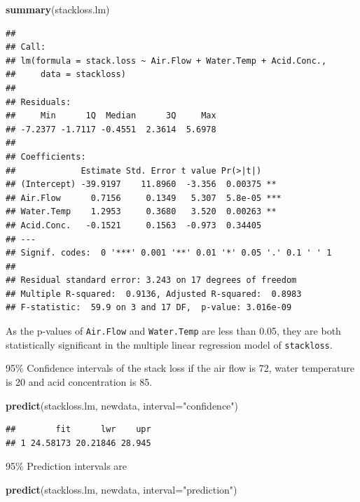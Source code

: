 \documentclass[]{article}
\newenvironment{Shaded}{\begin{snugshade}}{\end{snugshade}}
\newcommand{\KeywordTok}[1]{\textcolor[rgb]{0.13,0.29,0.53}{\textbf{{#1}}}}
\newcommand{\DataTypeTok}[1]{\textcolor[rgb]{0.13,0.29,0.53}{{#1}}}
\newcommand{\StringTok}[1]{\textcolor[rgb]{0.31,0.60,0.02}{{#1}}}
\newcommand{\NormalTok}[1]{{#1}}
\numberwithin{equation}{section}
\begin{document}
\begin{Shaded}
\begin{Highlighting}[]
\KeywordTok{summary}\NormalTok{(stackloss.lm)}
\end{Highlighting}
\end{Shaded}

\begin{verbatim}
## 
## Call:
## lm(formula = stack.loss ~ Air.Flow + Water.Temp + Acid.Conc., 
##     data = stackloss)
## 
## Residuals:
##     Min      1Q  Median      3Q     Max 
## -7.2377 -1.7117 -0.4551  2.3614  5.6978 
## 
## Coefficients:
##             Estimate Std. Error t value Pr(>|t|)    
## (Intercept) -39.9197    11.8960  -3.356  0.00375 ** 
## Air.Flow      0.7156     0.1349   5.307  5.8e-05 ***
## Water.Temp    1.2953     0.3680   3.520  0.00263 ** 
## Acid.Conc.   -0.1521     0.1563  -0.973  0.34405    
## ---
## Signif. codes:  0 '***' 0.001 '**' 0.01 '*' 0.05 '.' 0.1 ' ' 1
## 
## Residual standard error: 3.243 on 17 degrees of freedom
## Multiple R-squared:  0.9136, Adjusted R-squared:  0.8983 
## F-statistic:  59.9 on 3 and 17 DF,  p-value: 3.016e-09
\end{verbatim}

As the p-values of \texttt{Air.Flow} and \texttt{Water.Temp} are less
than 0.05, they are both statistically significant in the multiple
linear regression model of \texttt{stackloss}.

95\% Confidence intervals of the stack loss if the air flow is 72, water
temperature is 20 and acid concentration is 85.

\begin{Shaded}
\begin{Highlighting}[]
\KeywordTok{predict}\NormalTok{(stackloss.lm, newdata, }\DataTypeTok{interval=}\StringTok{"confidence"}\NormalTok{)}
\end{Highlighting}
\end{Shaded}

\begin{verbatim}
##        fit      lwr    upr
## 1 24.58173 20.21846 28.945
\end{verbatim}

95\% Prediction intervals are

\begin{Shaded}
\begin{Highlighting}[]
\KeywordTok{predict}\NormalTok{(stackloss.lm, newdata, }\DataTypeTok{interval=}\StringTok{"prediction"}\NormalTok{)}
\end{Highlighting}
\end{Shaded}
\end{document}
